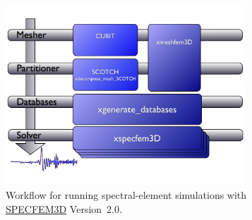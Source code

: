 \documentclass[referee,extra]{gji}
\begin{document}
\clearpage


\begin{figure}
\begin{center}
\includegraphics[width=0.8\textwidth]{./images/processing.jpg}
\end{center}
\caption{Workflow for running spectral-element simulations with \href{http://www.geodynamics.org/cig/software/specfem3d}{SPECFEM3D} Version~2.0.
}
\label{figure:processing}
\end{figure}
\end{document}
